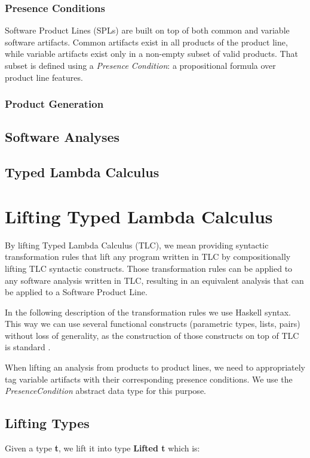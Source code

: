 \documentclass[11pt]{article} %
\begin{document}
\subsubsection{Presence Conditions}
Software Product Lines (SPLs) are built on top of both common and variable software artifacts. Common artifacts exist in all products of the product line, while variable artifacts exist only in a non-empty subset of valid products. That subset is defined using a \emph{Presence Condition}: a propositional formula over product line features.

\subsubsection{Product Generation}

\subsection{Software Analyses}

\subsection{Typed Lambda Calculus}

\section{Lifting Typed Lambda Calculus}

By lifting Typed Lambda Calculus (TLC), we mean providing syntactic transformation rules that lift any program written in TLC by compositionally lifting TLC syntactic constructs. Those transformation rules can be applied to any software analysis written in TLC, resulting in an equivalent analysis that can be applied to a Software Product Line.

In the following description of the transformation rules we use Haskell syntax. This way we can use several functional constructs (parametric types, lists, pairs) without loss of generality, as the construction of those constructs on top of TLC is standard \cite{Pierce2002}.

When lifting an analysis from products to product lines, we need to appropriately tag variable artifacts with their corresponding presence conditions. We use the \emph{PresenceCondition} abstract data type for this purpose.

\subsection{Lifting Types}
Given a type \textbf{t}, we lift it into type \textbf{Lifted t} which is:
\end{document}
